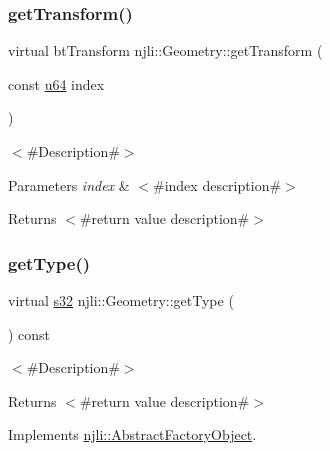 \mbox{\label{classnjli_1_1_geometry_acf510a790969aae6641ae068f1d804ea}} 
\subsubsection{\texorpdfstring{get\+Transform()}{getTransform()}}
{\footnotesize\ttfamily virtual bt\+Transform njli\+::\+Geometry\+::get\+Transform (\begin{DoxyParamCaption}\item[{const \mbox{\hyperlink{_util_8h_ad758b7a5c3f18ed79d2fcd23d9f16357}{u64}}}]{index }\end{DoxyParamCaption})\hspace{0.3cm}{\ttfamily [virtual]}}

$<$\#\+Description\#$>$


\begin{DoxyParams}{Parameters}
{\em index} & $<$\#index description\#$>$\\
\hline
\end{DoxyParams}
\begin{DoxyReturn}{Returns}
$<$\#return value description\#$>$ 
\end{DoxyReturn}
\mbox{\label{classnjli_1_1_geometry_ac13aedbb6914e12416c46574805cb13a}} 
\subsubsection{\texorpdfstring{get\+Type()}{getType()}}
{\footnotesize\ttfamily virtual \mbox{\hyperlink{_util_8h_aa62c75d314a0d1f37f79c4b73b2292e2}{s32}} njli\+::\+Geometry\+::get\+Type (\begin{DoxyParamCaption}{ }\end{DoxyParamCaption}) const\hspace{0.3cm}{\ttfamily [virtual]}}

$<$\#\+Description\#$>$

\begin{DoxyReturn}{Returns}
$<$\#return value description\#$>$ 
\end{DoxyReturn}


Implements \mbox{\hyperlink{classnjli_1_1_abstract_factory_object_a207c86146d40d0794708ae7f2d4e60a7}{njli\+::\+Abstract\+Factory\+Object}}.



